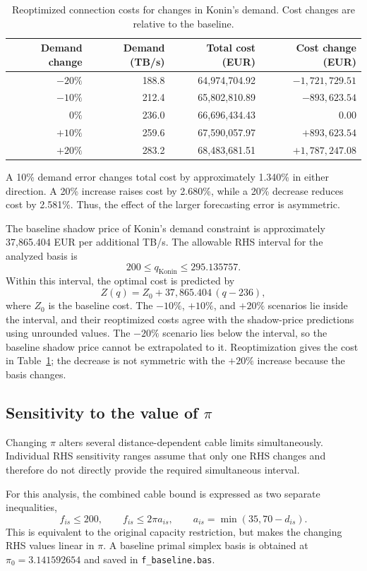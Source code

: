 \documentclass[11pt,a4paper]{article}
\begin{document}
\begin{table}[htbp]
\centering
\small
\begin{tabular}{rrrr}
\toprule
Demand change & Demand (TB/s) & Total cost (EUR) & Cost change (EUR)\\
\midrule
$-20\%$ & 188.8 & 64,974,704.92 & $-1,721,729.51$\\
$-10\%$ & 212.4 & 65,802,810.89 & $-893,623.54$\\
$0\%$ & 236.0 & 66,696,434.43 & 0.00\\
$+10\%$ & 259.6 & 67,590,057.97 & $+893,623.54$\\
$+20\%$ & 283.2 & 68,483,681.51 & $+1,787,247.08$\\
\bottomrule
\end{tabular}
\caption{Reoptimized connection costs for changes in Konin's demand. Cost changes are relative to the baseline.}
\label{tab:konin-sensitivity}
\end{table}

A 10\% demand error changes total cost by approximately 1.340\% in either direction. A 20\% increase raises cost by 2.680\%, while a 20\% decrease reduces cost by 2.581\%. Thus, the effect of the larger forecasting error is asymmetric.

The baseline shadow price of Konin's demand constraint is approximately 37,865.404 EUR per additional TB/s. The allowable RHS interval for the analyzed basis is
\[
200\le q_{\text{Konin}}\le295.135757.
\]
Within this interval, the optimal cost is predicted by
\[
Z(q)=Z_0+37{,}865.404\,(q-236),
\]
where $Z_0$ is the baseline cost. The $-10\%$, $+10\%$, and $+20\%$ scenarios lie inside the interval, and their reoptimized costs agree with the shadow-price predictions using unrounded values. The $-20\%$ scenario lies below the interval, so the baseline shadow price cannot be extrapolated to it. Reoptimization gives the cost in Table~\ref{tab:konin-sensitivity}; the decrease is not symmetric with the $+20\%$ increase because the basis changes.

\subsection{Sensitivity to the value of $\pi$}
Changing $\pi$ alters several distance-dependent cable limits simultaneously. Individual RHS sensitivity ranges assume that only one RHS changes and therefore do not directly provide the required simultaneous interval.

For this analysis, the combined cable bound is expressed as two separate inequalities,
\[
f_{is}\le200,\qquad f_{is}\le2\pi a_{is},
\qquad a_{is}=\min(35,70-d_{is}).
\]
This is equivalent to the original capacity restriction, but makes the changing RHS values linear in $\pi$. A baseline primal simplex basis is obtained at $\pi_0=3.141592654$ and saved in \texttt{f\_baseline.bas}.
\end{document}

